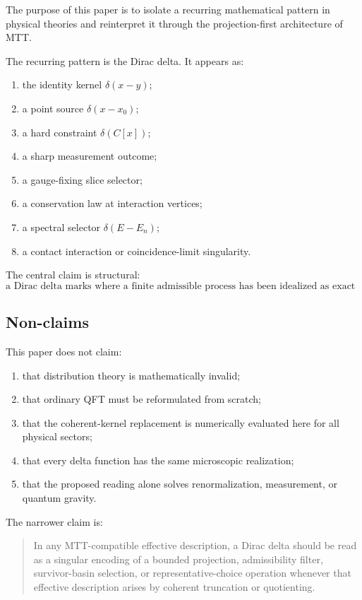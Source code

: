 \documentclass[11pt]{article}
\begin{document}
The purpose of this paper is to isolate a recurring mathematical pattern in physical
theories and reinterpret it through the projection-first architecture of MTT.

The recurring pattern is the Dirac delta. It appears as:
\begin{enumerate}
\item the identity kernel \(\delta(x-y)\);
\item a point source \(\delta(x-x_0)\);
\item a hard constraint \(\delta(C[x])\);
\item a sharp measurement outcome;
\item a gauge-fixing slice selector;
\item a conservation law at interaction vertices;
\item a spectral selector \(\delta(E-E_n)\);
\item a contact interaction or coincidence-limit singularity.
\end{enumerate}

The central claim is structural:
\[
\boxed{\text{a Dirac delta marks where a finite admissible process has been
idealized as exact zero-width selection.}}
\]

\subsection{Non-claims}

This paper does not claim:
\begin{enumerate}
\item that distribution theory is mathematically invalid;
\item that ordinary QFT must be reformulated from scratch;
\item that the coherent-kernel replacement is numerically evaluated here for all physical sectors;
\item that every delta function has the same microscopic realization;
\item that the proposed reading alone solves renormalization, measurement, or quantum gravity.
\end{enumerate}

The narrower claim is:

\begin{quote}
In any MTT-compatible effective description, a Dirac delta should be read as a
singular encoding of a bounded projection, admissibility filter, survivor-basin
selection, or representative-choice operation whenever that effective description
arises by coherent truncation or quotienting.
\end{quote}
\end{document}
